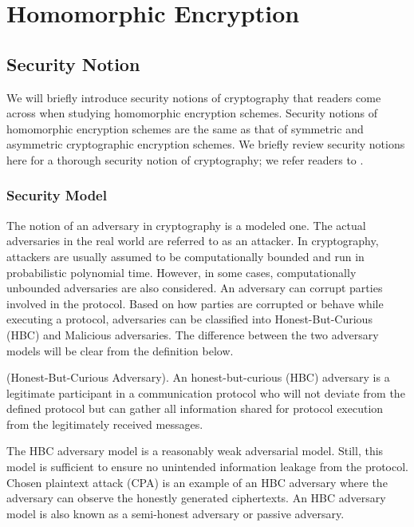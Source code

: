 
\chapter{Homomorphic Encryption}
\setcounter{section}{0}


\section{Security Notion}
We will briefly introduce security notions of cryptography that readers come across when studying homomorphic encryption schemes. Security notions of homomorphic encryption schemes are the same as that of symmetric and asymmetric cryptographic encryption schemes. We briefly review security notions here for a thorough security notion of cryptography; we refer readers to \cite{katz2020introduction}.


\subsection{Security Model}
The notion of an adversary in cryptography is a modeled one. The actual adversaries in the real world are referred to as an attacker. In cryptography, attackers are usually assumed to be computationally bounded and run in probabilistic polynomial time. However, in some cases, computationally unbounded adversaries are also considered. An adversary can corrupt parties involved in the protocol. Based on how parties are corrupted or behave while executing a protocol, adversaries can be classified into Honest-But-Curious (HBC) and Malicious adversaries. The difference between the two adversary models will be clear from the definition below.

\begin{definition} \cite{goldreich2009foundations} (Honest-But-Curious Adversary). An honest-but-curious (HBC) adversary is a legitimate participant in a communication protocol who will not deviate from the defined protocol but can gather all information shared for protocol execution from the legitimately received messages.
\end{definition}

The HBC adversary model is a reasonably weak adversarial model. Still, this model is sufficient to ensure no unintended information leakage from the protocol. Chosen plaintext attack (CPA) is an example of an HBC adversary where the adversary can observe the honestly generated ciphertexts. An HBC adversary model is also known as a semi-honest adversary or passive adversary.


